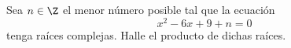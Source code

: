 Sea $n\in \Z$ el menor número posible tal que la ecuación
\vspace{-.2cm}
\begin{equation*}
x^2-6x+9+n=0
\end{equation*}
tenga raíces complejas. Halle el producto de dichas raíces.
